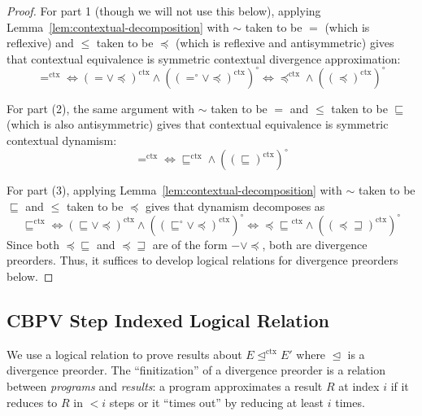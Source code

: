 \documentclass[acmsmall,nonacm]{acmart}
\newcommand{\ltdyn}{\sqsubseteq}
\newcommand{\gtdyn}{\sqsupseteq}
\newcommand{\apreorder}{\trianglelefteq}
\newcommand{\ctxize}[1]{\mathrel{{#1}^{\text{ctx}}}}
\newcommand\errordivergeleft[0]{\preceq\ltdyn}
\newcommand\errordivergerightop[0]{\preceq\gtdyn}
\begin{document}
{\begin{longonly}
\begin{proof}
For part 1 (though we will not use this below), applying
Lemma~\ref{lem:contextual-decomposition} with $\sim$ taken to be $=$
(which is reflexive) and $\leqslant$ taken to be $\preceq$ (which is
reflexive and antisymmetric) gives that contextual equivalence is
symmetric contextual divergence approximation:
\[
\ctxize= \Leftrightarrow \ctxize{(= \vee \preceq)} \wedge (\ctxize{(=^\circ \vee \preceq)})^\circ
         \Leftrightarrow \ctxize{\preceq} \wedge (\ctxize{(\preceq)})^\circ
\]

For part (2), the same argument with $\sim$ taken to be $=$ and
$\leqslant$ taken to be $\ltdyn$ (which is also antisymmetric) gives that
contextual equivalence is symmetric contextual dynamism:
\[
\ctxize= \Leftrightarrow \ctxize{\ltdyn} \wedge (\ctxize{(\ltdyn)})^\circ
\]

For part (3), applying Lemma~\ref{lem:contextual-decomposition} with $\sim$
taken to be $\ltdyn$ and $\leqslant$ taken to be $\preceq$ gives that
dynamism decomposes as
\[
\ctxize\ltdyn \Leftrightarrow \ctxize{(\ltdyn \vee \preceq)} \wedge (\ctxize{(\ltdyn^\circ \vee \preceq)})^\circ
              \Leftrightarrow \ctxize{\errordivergeleft} \wedge (\ctxize{(\errordivergerightop)})^\circ
\]
Since both ${\errordivergeleft}$ and $\errordivergerightop$ are of the
form $- \vee \preceq$, both are divergence preorders.  Thus, it suffices
to develop logical relations for divergence preorders below.
\end{proof}
\end{longonly}

\subsection{CBPV Step Indexed Logical Relation}
\label{sec:lr}

\begin{shortonly}
We use a logical relation to prove results about $E \ctxize\apreorder
E'$ where $\apreorder$ is a divergence preorder.  The
``finitization'' of a divergence preorder is a relation between
\emph{programs} and \emph{results}: a program approximates a result $R$
at index $i$ if it reduces to $R$ in $< i$ steps or it ``times out'' by reducing at least $i$ times.
\end{shortonly}

}
\end{document}
